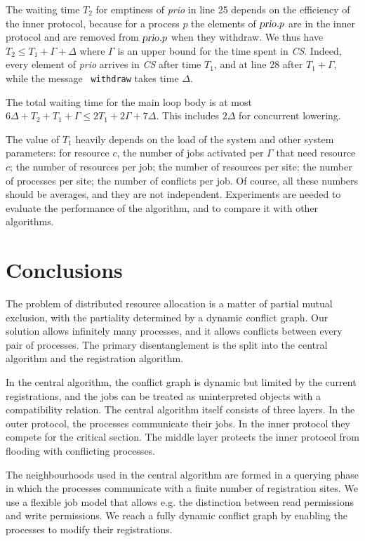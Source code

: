 \documentclass[10pt]{article} \usepackage[english]{babel}
\def\S #1/{\mbox {\textsl{#1}}}
\def\T #1/{\mbox {\texttt{#1}}}
\begin{document}
The waiting time $T_2$ for emptiness of \S prio/ in line 25 depends on
the efficiency of the inner protocol, because for a process $p$ the
elements of $\S prio/.p$ are in the inner protocol and are removed
from $ \S prio/.p$ when they withdraw.  We thus have $T_2\leq
T_1+\Gamma+\Delta$ where $\Gamma$ is an upper bound for the time spent
in \S CS/.  Indeed, every element of \S prio/ arrives in \S CS/ after
time $T_1$, and at line 28 after $T_1+\Gamma$, while the message \T
withdraw/ takes time $\Delta$.  

The total waiting time for the main loop body is at most $6\Delta +
T_2 + T_1 + \Gamma \leq 2T_1 + 2\Gamma + 7\Delta $.  This includes
$2\Delta$ for concurrent lowering.

The value of $T_1$ heavily depends on the load of the system
and other system parameters: for resource $c$, the number of jobs
activated per $\Gamma$ that need resource $c$; the number of resources
per job; the number of resources per site; the number of processes per
site; the number of conflicts per job.  Of course, all these numbers
should be averages, and they are not independent.  Experiments are
needed to evaluate the performance of the algorithm, and to compare it
with other algorithms.

\section{Conclusions} \label{conclusion}

The problem of distributed resource allocation is a matter of partial
mutual exclusion, with the partiality determined by a dynamic conflict
graph.  Our solution allows infinitely many processes, and it allows
conflicts between every pair of processes.  The primary
disentanglement is the split into the central algorithm and the
registration algorithm.

In the central algorithm, the conflict graph is dynamic but limited by
the current registrations, and the jobs can be treated as
uninterpreted objects with a compatibility relation.  The central
algorithm itself consists of three layers.  In the outer protocol, the
processes communicate their jobs.  In the inner protocol they compete
for the critical section.  The middle layer protects the inner
protocol from flooding with conflicting processes.

The neighbourhoods used in the central algorithm are formed in a
querying phase in which the processes communicate with a finite number
of registration sites.  We use a flexible job model that allows e.g.
the distinction between read permissions and write permissions.  We
reach a fully dynamic conflict graph by enabling the processes to
modify their registrations.
\end{document}
